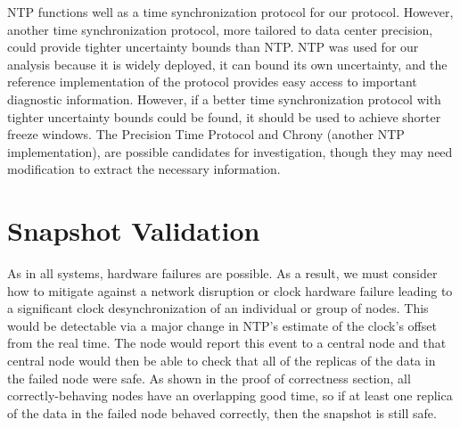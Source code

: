 NTP functions well as a time synchronization protocol for our protocol. However, another time synchronization protocol, more tailored to data center precision, could provide tighter uncertainty bounds than NTP. NTP
was used for our analysis because it is widely deployed, it can bound
its own uncertainty, and the reference implementation of the protocol
provides easy access to important diagnostic information. However, if a better time synchronization protocol with tighter uncertainty bounds could be found, it should be used to achieve shorter freeze windows. The Precision Time Protocol and Chrony (another NTP implementation), are possible candidates for investigation, though they may need modification to extract the necessary information.

\section{Snapshot Validation}

As in all systems, hardware failures are possible. As a result, we
must consider how to mitigate against a network disruption or clock
hardware failure leading to a significant clock desynchronization of
an individual or group of nodes. This would be detectable via a major
change in NTP's estimate of the clock's offset from the real time.
The node would report this event to a central node and that central node would then be able to check that all of the replicas of the data in the failed node were safe. As shown in the
proof of correctness section, all correctly-behaving nodes have an
overlapping good time, so if at least one replica of the data in the failed node behaved
correctly, then the snapshot is still safe.

